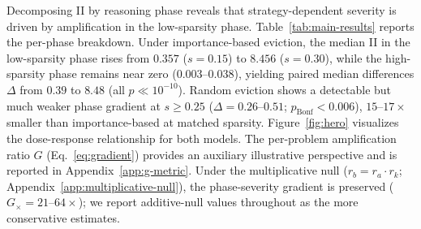 Decomposing II by reasoning phase reveals that strategy-dependent severity is driven by amplification in the low-sparsity phase. Table~\ref{tab:main-results} reports the per-phase breakdown. Under importance-based eviction, the median II in the low-sparsity phase rises from $0.357$ ($s{=}0.15$) to $8.456$ ($s{=}0.30$), while the high-sparsity phase remains near zero ($0.003$--$0.038$), yielding paired median differences $\Delta$ from $0.39$ to $8.48$ (all $p \ll 10^{-10}$). Random eviction shows a detectable but much weaker phase gradient at $s \geq 0.25$ ($\Delta{=}0.26$--$0.51$; $p_{\text{Bonf}} < 0.006$), $15$--$17{\times}$ smaller than importance-based at matched sparsity. Figure~\ref{fig:hero} visualizes the dose-response relationship for both models. The per-problem amplification ratio $G$ (Eq.~\ref{eq:gradient}) provides an auxiliary illustrative perspective and is reported in Appendix~\ref{app:g-metric}.
Under the multiplicative null ($r_b = r_a \cdot r_k$; Appendix~\ref{app:multiplicative-null}), the phase-severity gradient is preserved ($G_{\times}{=}21$--$64{\times}$); we report additive-null values throughout as the more conservative estimates.

